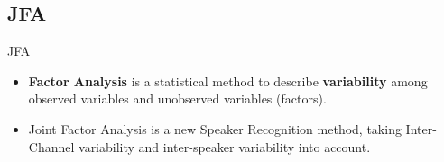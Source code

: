 
\subsection{JFA}

\begin{frame}{JFA}
  \begin{itemize}
    \item \textbf{Factor Analysis} is a statistical method to describe \textbf{variability}
      among observed variables and unobserved variables (factors).

    \item Joint Factor Analysis is a new Speaker Recognition method, taking
      Inter-Channel variability and inter-speaker variability into account.

  \end{itemize}

\end{frame}
